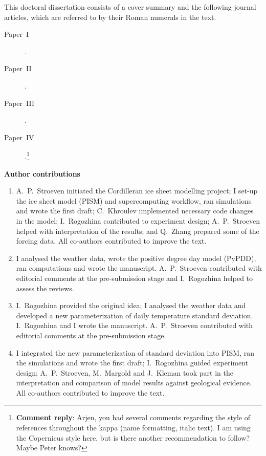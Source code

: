 \documentclass{article}
\newcommand{\renote}[1]{\footnote{\textbf{Comment reply}: #1}}
\newcommand{\CCLI}[0]{Paper~I}      %
\newcommand{\PSDV}[0]{Paper~II}     %
\newcommand{\PSDP}[0]{Paper~III}    %
\newcommand{\CCYC}[0]{Paper~IV}     %
\begin{document}
This doctoral dissertation consists of a cover summary and the following
journal articles, which are referred to by their Roman numerals in the text.

\begin{description}
  \item[\CCLI] .
  \item[\PSDV] .
  \item[\PSDP] .
  \item[\CCYC] .\renote{
    Arjen, you had several comments regarding the style of references
    throughout the kappa (name formatting, italic text). I am using the
    Copernicus style here, but is there another recommendation to follow?
    Maybe Peter knows?}
\end{description}

\vfill
\noindent\textbf{Author contributions}

\footnotesize{\begin{enumerate}
  \item[I] A.~P.~Stroeven initiated the Cordilleran ice sheet modelling
project; I set-up the ice sheet model (PISM) and supercomputing workflow, ran
simulations and wrote the first draft; C.~Khroulev implemented necessary code
changes in the model; I.~Rogozhina contributed to experiment design; A.~P.~Stroeven
helped with interpretation of the results; and Q.~Zhang prepared some of the
forcing data. All co-authors contributed to improve the text.
  \item[II] I analysed the weather data, wrote the positive degree day model
(PyPDD), ran computations and wrote the manuscript. A.~P.~Stroeven contributed
with editorial comments at the pre-submission stage and I.~Rogozhina helped to
assess the reviews.
  \item[III] I.~Rogozhina provided the original idea; I analysed the weather
data and developed a new parameterization of daily temperature standard
deviation. I.~Rogozhina and I wrote the manuscript. A.~P.~Stroeven contributed
with editorial comments at the pre-submission stage.
  \item[IV] I integrated the new parameterization of standard deviation into
PISM, ran the simulations and wrote the first draft; I.~Rogozhina guided
experiment design; A.~P.~Stroeven, M.~Margold and J.~Kleman took part in the
interpretation and comparison of model results against geological evidence. All
co-authors contributed to improve the text.
\end{enumerate}}
\end{document}
